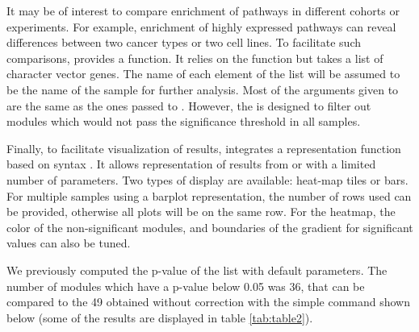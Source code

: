 

It may be of interest to compare enrichment of pathways in different cohorts or
experiments. For example, enrichment of highly expressed pathways can reveal
differences between two cancer types or two cell lines.  To facilitate such
comparisons,  provides a  function.
It relies on the  function but takes a list of character
vector genes. The name of each element of the list will be assumed to be the
name of the sample for further analysis.  Most of the arguments given to
 are the same as the ones passed to
. However, the  is designed to filter
out modules which would not pass the significance threshold in all samples.   


Finally, to facilitate visualization of results,  integrates a
representation function based on  syntax \citep{ggplot2}. It
allows representation of results from  or
 with a limited number of parameters. Two types of
display are available: heat-map tiles or bars. For multiple samples using a
barplot representation, the number of rows used can be provided, otherwise all
plots will be on the same row. For the heatmap, the color of the
non-significant modules, and boundaries of the gradient for significant values
can also be tuned.

We previously computed the p-value of the  list with default
parameters. The number of modules which have a p-value below 0.05 was 36, that
can be compared to the 49 obtained without correction with the simple command
shown below (some of the results are displayed in table \ref{tab:table2}).


